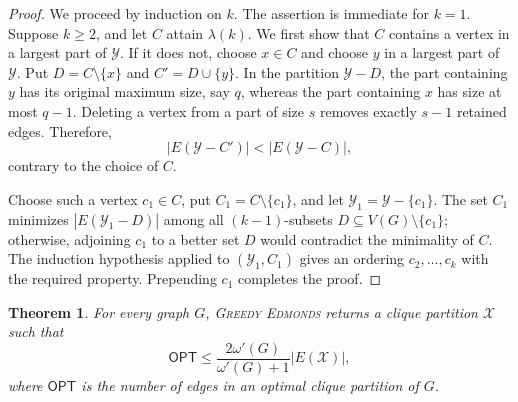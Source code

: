 \documentclass[a4paper,fleqn]{cas-sc}
\newtheorem{thm}{Theorem}[section]
\theoremstyle{remark}
\theoremstyle{plain}
\newcommand{\edmonds}{{\textsc{Greedy Edmonds}}}
\newcommand{\opt}{{\mathsf{OPT}}}
\begin{document}
\begin{proof}
We proceed by induction on $k$. The assertion is immediate for $k=1$.
Suppose $k\geq 2$, and let $C$ attain $\lambda(k)$. We first show
that $C$ contains a vertex in a largest part of $\mathcal{Y}$. If it
does not, choose $x\in C$ and choose $y$ in a largest part of
$\mathcal{Y}$. Put $D=C\setminus\{x\}$ and
$C'=D\cup\{y\}$. In the partition $\mathcal{Y}-D$, the part
containing $y$ has its original maximum size, say $q$, whereas the
part containing $x$ has size at most $q-1$. Deleting a vertex from a
part of size $s$ removes exactly $s-1$ retained edges. Therefore,
\[
   |E(\mathcal{Y}-C')|<|E(\mathcal{Y}-C)|,
\]
contrary to the choice of $C$.

Choose such a vertex $c_1\in C$, put
$C_1=C\setminus\{c_1\}$, and let
$\mathcal{Y}_1=\mathcal{Y}-\{c_1\}$. The set $C_1$ minimizes
$|E(\mathcal{Y}_1-D)|$ among all $(k-1)$-subsets
$D\subseteq V(G)\setminus\{c_1\}$; otherwise, adjoining $c_1$ to a
better set $D$ would contradict the minimality of $C$. The induction
hypothesis applied to $(\mathcal{Y}_1,C_1)$ gives an ordering
$c_2,\ldots,c_k$ with the required property. Prepending $c_1$
completes the proof.
\end{proof}

\begin{thm} \label{edmonds1}
    For every graph $G$, \edmonds{} returns a clique partition $\mathcal{X}$ such that \[\opt \leq \frac{2\omega'(G)}{\omega'(G)+1}|E(\mathcal{X})|,\] where $\opt$ is the number of edges in an optimal clique partition of $G$. 
\end{thm}
\end{document}
